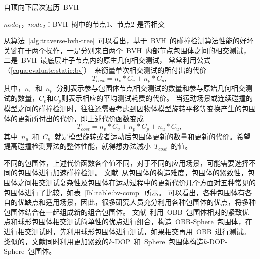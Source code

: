 \begin{algorithm}
\small
\caption{自顶向下层次遍历~BVH~}
\label{alg:traverse-bvh-tree}
\begin{algorithmic}[1]
\Require
$node_1$，$node_2$：BVH~树中的节点1、节点2
\Ensure
是否相交
    \State {} 
  \Else
               
           \Else
              \State {} 
              \EndFor
           \EndIf
      \Else
           \State {}  
           \EndFor
      \EndIf
  \EndIf
\EndFunction
\end{algorithmic}
\end{algorithm}
从算法~\ref{alg:traverse-bvh-tree}~可以看出，基于~BVH~的碰撞检测算法性能的好坏关键在于两个操作，一是分别来自两个~BVH~内部节点包围体之间的相交测试，二是~BVH~最底层叶子节点内的原生几何相交测试，
常常利用公式（\ref{equa:evaluate:static:bv}）~来衡量单次相交测试的所付出的代价
\begin{equation}
T_{cost} = n_v * C_v + n_p * C_p,
\label{equa:evaluate:static:bv}
\end{equation}
其中，$n_v$~和~$n_p$~分别表示参与包围体节点相交测试的数量和参与原始几何相交测试的数量，$C_v$和$C_p$则表示相应的平均测试耗费的代价\cite{klosowski1998efficient}。
当运动场景或连续碰撞的模型之间的碰撞检测时，往往还需要考虑到因物体模型旋转平移等变换产生的包围体的更新所付出的代价，即上述代价函数变成
\begin{equation}
T_{cost} = n_v * C_v + n_p * C_p + n_u * C_u,
  \label{equa:evaluate:dynamic:bv}
\end{equation}
其中~$n_u$~和~$C_n$~就是模型旋转或者运动后包围体更新的数量和更新的代价。希望提高碰撞检测算法的整体性能，就得想办法减小~$T_{cost}$~的值。

不同的包围体，上述代价函数各个值不同，对于不同的应用场景，可能需要选择不同的包围体进行加速碰撞检测。
文献~从包围体的构造难度，包围体的紧致性，包围体之间相交测试复杂性及包围体在运动过程中的更新代价几个方面对五种常见的包围体进行了比较，如表~\ref{lbl:table:bv-comp}~所示。
可以看出，各种包围体有各自的优缺点和适用场景，因此，很多研究人员充分利用各种包围体的优点，将多种包围体结合在一起组成新的组合包围体。
文献~利用~OBB~包围体相对的紧致优点和球形包围体相交测试简单性的优点进行组合，构造~OBB-Sphere~包围体，在进行相交测试时，先利用球形包围体进行测试，如果相交再用~OBB~进行测试。
类似的，文献同时利用更加紧致的$k$-DOP~和~Sphere~包围体构造$k$-DOP-Sphere~包围体。

